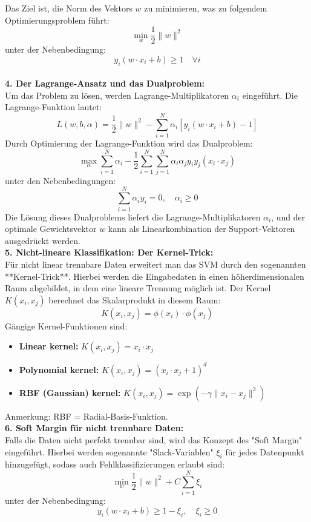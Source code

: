 \documentclass[12pt]{article}
\begin{document}
Das Ziel ist, die Norm des Vektors \(w\) zu minimieren, was zu folgendem Optimierungsproblem führt:
\[
\min_w \frac{1}{2} \|w\|^2
\]
unter der Nebenbedingung:
\[
y_i (w \cdot x_i + b) \geq 1 \quad \forall i
\]\\
\textbf{4. Der Lagrange-Ansatz und das Dualproblem:} \\
Um das Problem zu lösen, werden Lagrange-Multiplikatoren \(\alpha_i\) eingeführt. Die Lagrange-Funktion lautet:
\[
L(w, b, \alpha) = \frac{1}{2} \|w\|^2 - \sum_{i=1}^N \alpha_i [y_i (w \cdot x_i + b) - 1]
\]
%
Durch Optimierung der Lagrange-Funktion wird das Dualproblem:
\[
\max_{\alpha} \sum_{i=1}^N \alpha_i - \frac{1}{2} \sum_{i=1}^N \sum_{j=1}^N \alpha_i \alpha_j y_i y_j (x_i \cdot x_j)
\]
unter den Nebenbedingungen:
\[
\sum_{i=1}^N \alpha_i y_i = 0, \quad \alpha_i \geq 0
\]
%
Die Lösung dieses Dualproblems liefert die Lagrange-Multiplikatoren \(\alpha_i\), und der optimale Gewichtsvektor \(w\) kann als Linearkombination der Support-Vektoren ausgedrückt werden.\\[0.2cm]
%
\textbf{5. Nicht-lineare Klassifikation: Der Kernel-Trick:}\\
Für nicht linear trennbare Daten erweitert man das SVM durch den sogenannten **Kernel-Trick**. Hierbei werden die Eingabedaten in einen höherdimensionalen Raum abgebildet, in dem eine lineare Trennung möglich ist. Der Kernel \(K(x_i, x_j)\) berechnet das Skalarprodukt in diesem Raum:
\[
K(x_i, x_j) = \phi(x_i) \cdot \phi(x_j)
\]
%
Gängige Kernel-Funktionen sind:
\begin{itemize}
    \item \textbf{Linear kernel:} \( K(x_i, x_j) = x_i \cdot x_j \)
    \item \textbf{Polynomial kernel:} \( K(x_i, x_j) = (x_i \cdot x_j + 1)^d \)
    \item \textbf{RBF (Gaussian) kernel:} \( K(x_i, x_j) = \exp(-\gamma \|x_i - x_j\|^2) \)
\end{itemize}
%
Anmerkung: RBF = Radial-Basis-Funktion.\\[0.3cm]
%
\textbf{6. Soft Margin für nicht trennbare Daten:}\\
Falls die Daten nicht perfekt trennbar sind, wird das Konzept des "Soft Margin" eingeführt. Hierbei werden sogenannte "Slack-Variablen" \(\xi_i\) für jedes Datenpunkt hinzugefügt, sodass auch Fehlklassifizierungen erlaubt sind:\\
\[
\min_w \frac{1}{2} \|w\|^2 + C \sum_{i=1}^N \xi_i
\]
unter der Nebenbedingung:
\[
y_i (w \cdot x_i + b) \geq 1 - \xi_i, \quad \xi_i \geq 0
\]\\
\end{document}
